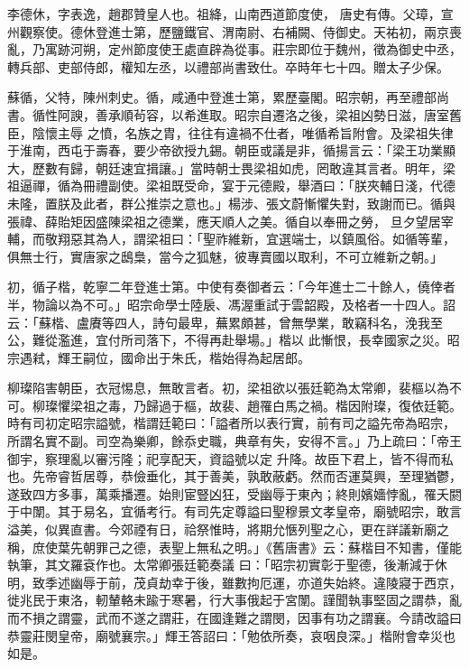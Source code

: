 \begin{pinyinscope}
 李德休，字表逸，趙郡贊皇人也。祖絳，山南西道節度使，
 唐史有傳。父璋，宣州觀察使。德休登進士第，歷鹽鐵官、渭南尉、右補闕、侍御史。天祐初，兩京喪亂，乃寓跡河朔，定州節度使王處直辟為從事。莊宗即位于魏州，徵為御史中丞，轉兵部、吏部侍郎，權知左丞，以禮部尚書致仕。卒時年七十四。贈太子少保。



 蘇循，父特，陳州刺史。循，咸通中登進士第，累歷臺閣。昭宗朝，再至禮部尚書。循性阿諛，善承順茍容，以希進取。昭宗自遷洛之後，梁祖凶勢日滋，唐室舊臣，陰懷主辱
 之憤，名族之胄，往往有違禍不仕者，唯循希旨附會。及梁祖失律于淮南，西屯于壽春，要少帝欲授九錫。朝臣或議是非，循揚言云：「梁王功業顯大，歷數有歸，朝廷速宜揖讓。」當時朝士畏梁祖如虎，罔敢違其言者。明年，梁祖逼禪，循為冊禮副使。梁祖既受命，宴于元德殿，舉酒曰：「朕夾輔日淺，代德未隆，置朕及此者，群公推崇之意也。」楊涉、張文蔚慚懼失對，致謝而已。循與張禕、薛貽矩因盛陳梁祖之德業，應天順人之美。循自以奉冊之勞，
 旦夕望居宰輔，而敬翔惡其為人，謂梁祖曰：「聖祚維新，宜選端士，以鎮風俗。如循等輩，俱無士行，實唐家之鴟梟，當今之狐魅，彼專賣國以取利，不可立維新之朝。」



 初，循子楷，乾寧二年登進士第。中使有奏御者云：「今年進士二十餘人，僥倖者半，物論以為不可。」昭宗命學士陸扆、馮渥重試于雲韶殿，及格者一十四人。詔云：「蘇楷、盧賡等四人，詩句最卑，蕪累頗甚，曾無學業，敢竊科名，浼我至公，難從濫進，宜付所司落下，不得再赴舉場。」楷以
 此慚恨，長幸國家之災。昭宗遇弒，輝王嗣位，國命出于朱氏，楷始得為起居郎。



 柳璨陷害朝臣，衣冠惕息，無敢言者。初，梁祖欲以張廷範為太常卿，裴樞以為不可。柳璨懼梁祖之毒，乃歸過于樞，故裴、趙罹白馬之禍。楷因附璨，復依廷範。時有司初定昭宗謚號，楷謂廷範曰：「謚者所以表行實，前有司之謚先帝為昭宗，所謂名實不副。司空為樂卿，餘忝史職，典章有失，安得不言。」乃上疏曰：「帝王御宇，察理亂以審污隆；祀享配天，資謚號以定
 升降。故臣下君上，皆不得而私也。先帝睿哲居尊，恭儉垂化，其于善美，孰敢蔽虧。然而否運莫興，至理猶鬱，遂致四方多事，萬乘播遷。始則宦豎凶狂，受幽辱于東內；終則嬪嬙悖亂，罹夭閼于中闈。其于易名，宜循考行。有司先定尊謚曰聖穆景文孝皇帝，廟號昭宗，敢言溢美，似異直書。今郊禋有日，祫祭惟時，將期允愜列聖之心，更在詳議新廟之稱，庶使葉先朝罪己之德，表聖上無私之明。」《舊唐書》云：蘇楷目不知書，僅能執筆，其文羅袞作也。太常卿張廷範奏議
 曰：「昭宗初實彰于聖德，後漸減于休明，致季述幽辱于前，茂貞劫幸于後，雖數拘厄運，亦道失始終。違陵寢于西京，徙兆民于東洛，軔輦輅未踰于寒暑，行大事俄起于宮闈。謹聞執事堅固之謂恭，亂而不損之謂靈，武而不遂之謂莊，在國逢難之謂閔，因事有功之謂襄。今請改謚曰恭靈莊閔皇帝，廟號襄宗。」輝王答詔曰：「勉依所奏，哀咽良深。」楷附會幸災也如是。




\end{pinyinscope}

